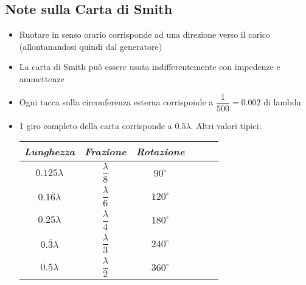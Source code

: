 \documentclass{article}
\begin{document}
\subsection{Note sulla Carta di Smith}
\begin{itemize}
	\item Ruotare in senso orario corrisponde ad una direzione verso il carico (allontanandosi quindi dal generatore)
	\item La carta di Smith può essere usata indifferentemente con impedenze e ammettenze
	\item Ogni tacca sulla circonferenza esterna corrisponde a \( \dfrac{1}{500} = 0.002 \) di lambda
	\item 1 giro completo della carta corrisponde a \(0.5 \lambda\). Altri valori tipici:
	      \vspace{5pt}
	      \begin{center}
		      \begin{tabular}{|Sc|Sc|Sc|}
			      \hline
			      \textit{Lunghezza}          & \textit{Frazione}      & \textit{Rotazione} \\
			      \hline
			      \(0.125 \lambda\)           & \(\dfrac{\lambda}{8}\) & \(90^\circ\)       \\
			      \hline
			      \(0.1\overline{6} \lambda\) & \(\dfrac{\lambda}{6}\) & \(120^\circ\)      \\
			      \hline
			      \(0.25 \lambda\)            & \(\dfrac{\lambda}{4}\) & \(180^\circ\)      \\
			      \hline
			      \(0.\overline{3} \lambda\)  & \(\dfrac{\lambda}{3}\) & \(240^\circ\)      \\
			      \hline
			      \(0.5 \lambda\)             & \(\dfrac{\lambda}{2}\) & \(360^\circ\)      \\
			      \hline
		      \end{tabular}
	      \end{center}
	      \vspace{5pt}
\end{itemize}

\newpage
\end{document}
